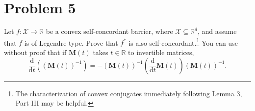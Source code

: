\section*{Problem 5}

Let $f : \mathcal{X} \to \mathbb{R}$ be a convex self-concordant barrier, where $\mathcal{X} \subseteq \mathbb{R}^d$, and assume that $f$ is of Legendre type. Prove that $f^*$ is also self-concordant.\footnote{The characterization of convex conjugates immediately following Lemma 3, Part III may be helpful.} You can use without proof that if $\mathbf{M}(t)$ takes $t \in \mathbb{R}$ to invertible matrices,
\[
\frac{\mathrm{d}}{\mathrm{d}t} \left( (\mathbf{M}(t))^{-1} \right) = -\left(\mathbf{M}(t)\right)^{-1} \left( \frac{\mathrm{d}}{\mathrm{d}t} \mathbf{M}(t) \right) \left(\mathbf{M}(t)\right)^{-1}.
\]

